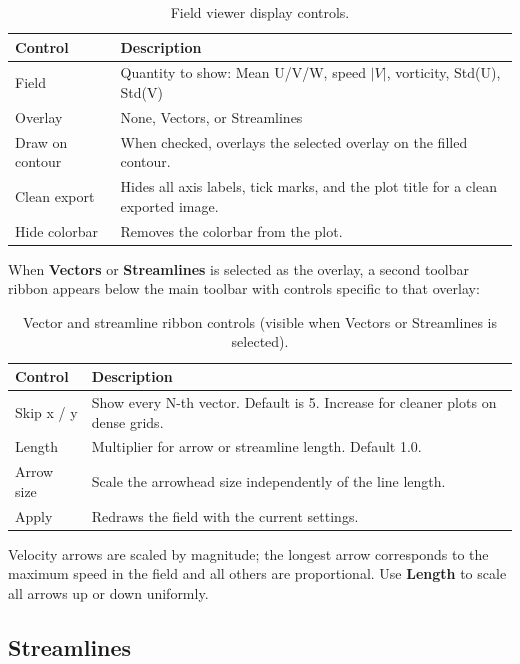 \documentclass[11pt, a4paper]{report}
\newcommand{\uipth}[1]{\textbf{\textcolor{upblue}{#1}}}
\begin{document}
\begin{table}[htbp]
\centering
\caption{Field viewer display controls.}
\begin{tabular}{lp{9cm}}
\toprule
\textbf{Control} & \textbf{Description} \\
\midrule
Field         & Quantity to show: Mean U/V/W, speed $|V|$, vorticity, Std(U), Std(V) \\
Overlay       & None, Vectors, or Streamlines \\
Draw on contour & When checked, overlays the selected overlay on the filled contour. \\
Clean export  & Hides all axis labels, tick marks, and the plot title for a clean exported image. \\
Hide colorbar & Removes the colorbar from the plot. \\
\bottomrule
\end{tabular}
\end{table}

When \uipth{Vectors} or \uipth{Streamlines} is selected as the overlay, a second toolbar ribbon appears below the main toolbar with controls specific to that overlay:

\begin{table}[htbp]
\centering
\caption{Vector and streamline ribbon controls (visible when Vectors or Streamlines is selected).}
\begin{tabular}{lp{9cm}}
\toprule
\textbf{Control} & \textbf{Description} \\
\midrule
Skip x / y    & Show every N-th vector. Default is 5. Increase for cleaner plots on dense grids. \\
Length        & Multiplier for arrow or streamline length. Default 1.0. \\
Arrow size    & Scale the arrowhead size independently of the line length. \\
Apply         & Redraws the field with the current settings. \\
\bottomrule
\end{tabular}
\end{table}

\begin{tipbox}
Velocity arrows are scaled by magnitude; the longest arrow corresponds to the maximum speed in the field and all others are proportional. Use \uipth{Length} to scale all arrows up or down uniformly.
\end{tipbox}

\subsection{Streamlines}
\end{document}
